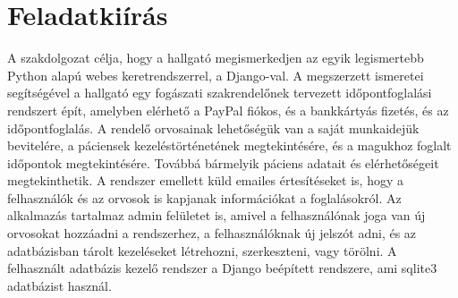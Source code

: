 \chapter*{Feladatkiírás}
A szakdolgozat célja, hogy a hallgató megismerkedjen az egyik legismertebb Python alapú webes keretrendszerrel, a Django-val. A megszerzett ismeretei segítségével a hallgató egy fogászati szakrendelőnek tervezett időpontfoglalási rendszert épít, amelyben elérhető a PayPal fiókos, és a bankkártyás fizetés, és az időpontfoglalás. A rendelő orvosainak lehetőségük van a saját munkaidejük bevitelére, a páciensek kezeléstörténetének megtekintésére, és a magukhoz foglalt időpontok megtekintésére. Továbbá bármelyik páciens adatait és elérhetőségeit megtekinthetik. A rendszer emellett küld emailes értesítéseket is, hogy a felhasználók és az orvosok is kapjanak információkat a foglalásokról. Az alkalmazás tartalmaz admin felületet is, amivel a felhasználónak joga van új orvosokat hozzáadni a rendszerhez, a felhasználóknak új jelszót adni, és az adatbázisban tárolt kezeléseket létrehozni, szerkeszteni, vagy törölni. A felhasznált adatbázis kezelő rendszer a Django beépített rendszere, ami sqlite3 adatbázist használ.
\lipsum[3-5]